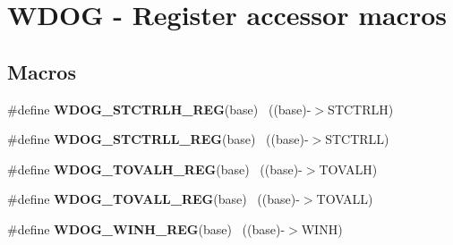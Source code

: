 \hypertarget{group___w_d_o_g___register___accessor___macros}{}\section{W\+D\+O\+G -\/ Register accessor macros}
\label{group___w_d_o_g___register___accessor___macros}
\subsection*{Macros}
\begin{DoxyCompactItemize}
\item 
\hypertarget{group___w_d_o_g___register___accessor___macros_gafe3961a26965f4d22fa82eb4a6906efa}{}\#define {\bfseries W\+D\+O\+G\+\_\+\+S\+T\+C\+T\+R\+L\+H\+\_\+\+R\+E\+G}(base)                                  ~((base)-\/$>$S\+T\+C\+T\+R\+L\+H)\label{group___w_d_o_g___register___accessor___macros_gafe3961a26965f4d22fa82eb4a6906efa}

\item 
\hypertarget{group___w_d_o_g___register___accessor___macros_gab5f636177e7295761f4d366fc6f2d9c5}{}\#define {\bfseries W\+D\+O\+G\+\_\+\+S\+T\+C\+T\+R\+L\+L\+\_\+\+R\+E\+G}(base)                                  ~((base)-\/$>$S\+T\+C\+T\+R\+L\+L)\label{group___w_d_o_g___register___accessor___macros_gab5f636177e7295761f4d366fc6f2d9c5}

\item 
\hypertarget{group___w_d_o_g___register___accessor___macros_gaa18bf2a6abf1641d711ee0a8e963d704}{}\#define {\bfseries W\+D\+O\+G\+\_\+\+T\+O\+V\+A\+L\+H\+\_\+\+R\+E\+G}(base)                                    ~((base)-\/$>$T\+O\+V\+A\+L\+H)\label{group___w_d_o_g___register___accessor___macros_gaa18bf2a6abf1641d711ee0a8e963d704}

\item 
\hypertarget{group___w_d_o_g___register___accessor___macros_gaf4ebf9d6344af3fa4c4cf0219a334dac}{}\#define {\bfseries W\+D\+O\+G\+\_\+\+T\+O\+V\+A\+L\+L\+\_\+\+R\+E\+G}(base)                                    ~((base)-\/$>$T\+O\+V\+A\+L\+L)\label{group___w_d_o_g___register___accessor___macros_gaf4ebf9d6344af3fa4c4cf0219a334dac}

\item 
\hypertarget{group___w_d_o_g___register___accessor___macros_gacb494604d8f57ea1aa0a6d8c9921b955}{}\#define {\bfseries W\+D\+O\+G\+\_\+\+W\+I\+N\+H\+\_\+\+R\+E\+G}(base)                                        ~((base)-\/$>$W\+I\+N\+H)\label{group___w_d_o_g___register___accessor___macros_gacb494604d8f57ea1aa0a6d8c9921b955}


\end{DoxyCompactItemize}
